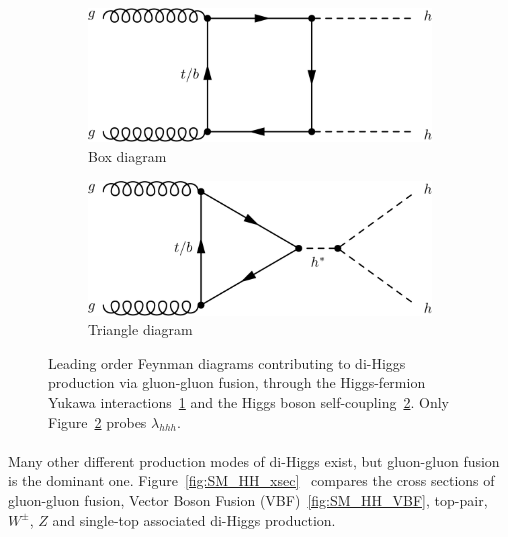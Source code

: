 \begin{figure}[h!]
\centering
\captionsetup{justification=centering}
    \begin{subfigure}[b]{0.4\textwidth}
        \includegraphics[width=\textwidth]{figures/theory/SM_HH_box}
        \caption{Box diagram}
        \label{fig:SM_HH_box}
    \end{subfigure}
    \quad
    \begin{subfigure}[b]{0.4\textwidth}
        \includegraphics[width=\textwidth]{figures/theory/SM_HH_tri}
        \caption{Triangle diagram}
        \label{fig:SM_HH_tri}
    \end{subfigure}
\caption{Leading order Feynman diagrams contributing to di-Higgs production via gluon-gluon fusion, through the Higgs-fermion Yukawa interactions~\ref{fig:SM_HH_box} and the Higgs boson self-coupling~\ref{fig:SM_HH_tri}. Only Figure~\ref{fig:SM_HH_tri} probes $\lambda_{hhh}$.}
\label{fig:SM_HH}
\end{figure}

\paragraph{}
Many other different production modes of di-Higgs exist, but gluon-gluon fusion is the dominant one. Figure~\ref{fig:SM_HH_xsec}~\cite{Frederix:2014hta} compares the cross sections of gluon-gluon fusion, Vector Boson Fusion (VBF)~\ref{fig:SM_HH_VBF}, top-pair, $W^{\pm}$, $Z$ and single-top associated di-Higgs production.

